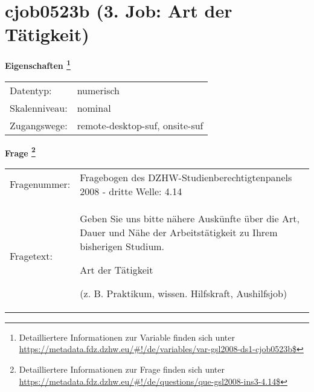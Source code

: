 
    \setcounter{footnote}{0}

    \vspace*{-1.8cm}
	\section{cjob0523b (3. Job: Art der Tätigkeit)}
	\label{section:cjob0523b}



    \vspace*{0.5cm}
    \noindent\textbf{Eigenschaften
	\footnote{Detailliertere Informationen zur Variable finden sich unter
		\url{https://metadata.fdz.dzhw.eu/\#!/de/variables/var-gsl2008-ds1-cjob0523b$}}}\\
	\begin{tabularx}{\hsize}{@{}lX}
	Datentyp: & numerisch \\
	Skalenniveau: & nominal \\
	Zugangswege: &
	  remote-desktop-suf, 
	  onsite-suf
 \\
    \end{tabularx}



				\vspace*{0.5cm}
                \noindent\textbf{Frage
	                \footnote{Detailliertere Informationen zur Frage finden sich unter
		              \url{https://metadata.fdz.dzhw.eu/\#!/de/questions/que-gsl2008-ins3-4.14$}}}\\
				\begin{tabularx}{\hsize}{@{}lX}
					Fragenummer: &
					  Fragebogen des DZHW-Studienberechtigtenpanels 2008 - dritte Welle:
					  4.14
 \\
					Fragetext: & Geben Sie uns bitte nähere Auskünfte über die Art, Dauer und Nähe der Arbeitstätigkeit zu Ihrem bisherigen Studium.\par  Art der Tätigkeit\par  (z. B. Praktikum, wissen. Hilfskraft, Aushilfsjob) \\
				\end{tabularx}





